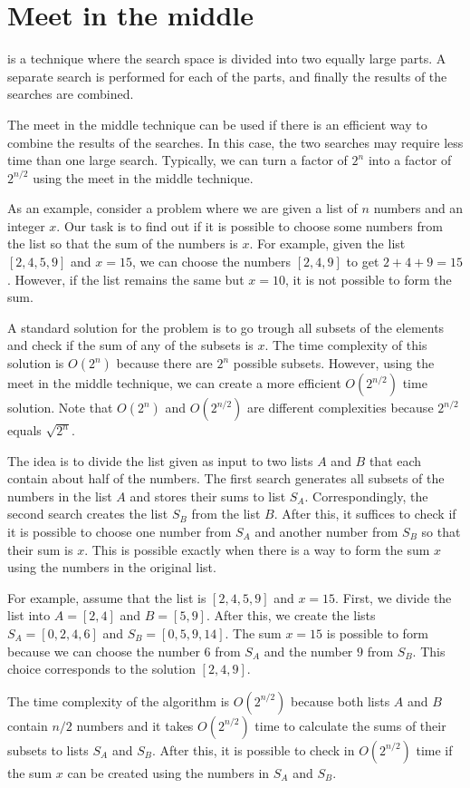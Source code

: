 \section{Meet in the middle}


 is a technique
where the search space is divided into
two equally large parts.
A separate search is performed
for each of the parts,
and finally the results of the searches are combined.

The meet in the middle technique can be used
if there is an efficient way to combine the
results of the searches.
In this case, the two searches may require less
time than one large search.
Typically, we can turn a factor of $2^n$
into a factor of $2^{n/2}$ using the meet in the
middle technique.

As an example, consider a problem where
we are given a list of $n$ numbers and
an integer $x$.
Our task is to find out if it is possible
to choose some numbers from the list so that
the sum of the numbers is $x$.
For example, given the list $[2,4,5,9]$ and $x=15$,
we can choose the numbers $[2,4,9]$ to get $2+4+9=15$.
However, if the list remains the same but $x=10$,
it is not possible to form the sum.

A standard solution for the problem is to
go trough all subsets of the elements and
check if the sum of any of the subsets is $x$.
The time complexity of this solution is $O(2^n)$
because there are $2^n$ possible subsets.
However, using the meet in the middle technique,
we can create a more efficient $O(2^{n/2})$ time solution.
Note that $O(2^n)$ and $O(2^{n/2})$ are different
complexities because $2^{n/2}$ equals $\sqrt{2^n}$.

The idea is to divide the list given as input
to two lists $A$ and $B$ that each contain
about half of the numbers.
The first search generates all subsets
of the numbers in the list $A$ and stores their sums
to list $S_A$.
Correspondingly, the second search creates
the list $S_B$ from the list $B$.
After this, it suffices to check if it is possible
to choose one number from $S_A$ and another
number from $S_B$ so that their sum is $x$.
This is possible exactly when there is a way to
form the sum $x$ using the numbers in the original list.

For example, assume that the list is $[2,4,5,9]$ and $x=15$.
First, we divide the list into $A=[2,4]$ and $B=[5,9]$.
After this, we create the lists
$S_A=[0,2,4,6]$ and $S_B=[0,5,9,14]$.
The sum $x=15$ is possible to form
because we can choose the number $6$ from $S_A$
and the number $9$ from $S_B$.
This choice corresponds to the solution $[2,4,9]$.

The time complexity of the algorithm is $O(2^{n/2})$
because both lists $A$ and $B$ contain $n/2$ numbers
and it takes $O(2^{n/2})$ time to calculate the sums of
their subsets to lists $S_A$ and $S_B$.
After this, it is possible to check in 
$O(2^{n/2})$ time if the sum $x$ can be created
using the numbers in $S_A$ and $S_B$.